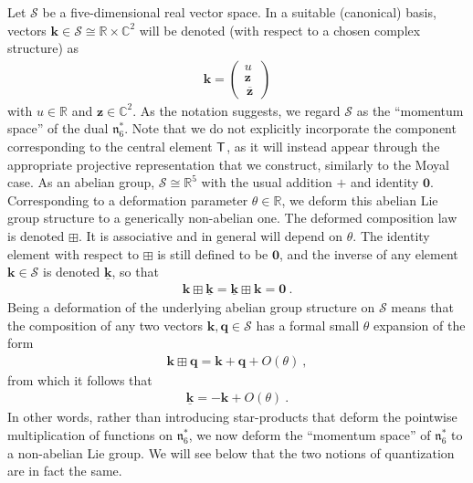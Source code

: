 \documentclass[11pt,a4paper]{article}
\newcommand{\comp}{\boxplus}                            %
\newcommand{\mbf}[1]{{\boldsymbol {#1} }}
\def\T{{\sf T}}
\def\mz{{\mbf z}}
\def\mk{{\mbf k}}
\def\mq{{\mbf q}}
\def\mfn{{\mathfrak n}}
\newcommand{\complex}{{\mathbb C}} %
\newcommand{\real}{{\mathbb R}} %
\newcommand{\beq}{\begin{eqnarray}}
\newcommand{\eeq}{\end{eqnarray}}
\begin{document}
Let $\mathcal{S}$ be a five-dimensional real vector space. In a
suitable (canonical) basis, vectors
$\mk\in\mathcal{S}\cong\real\times\complex^2$ will be denoted (with
respect to a chosen complex structure) as
\beq
\mk=\begin{pmatrix}u\\\mz\\\,\overline{\mz}\,\end{pmatrix}
\label{Svectors}\eeq
with $u\in\real$ and $\mz\in\complex^2$. As the notation suggests, we
regard $\mathcal{S}$ as the ``momentum space'' of the dual
$\mfn_6^*$. Note that we do not explicitly incorporate the component
corresponding to the central element $\T$, as it will instead appear
through the appropriate projective representation that we construct,
similarly to the Moyal case. As an abelian group,
$\mathcal{S}\cong\real^5$ with the usual addition $+$ and identity
$\mbf0$. Corresponding to a deformation parameter
$\theta\in\real$, we deform this abelian Lie group structure to a
generically non-abelian one. The deformed composition law is denoted
$\comp$. It is associative and in general will depend on
$\theta$. The identity element with respect to $\comp$ is still
defined to be $\mbf0$, and the inverse of any element $\mk\in\mathcal{S}$
is denoted $\underline{\mk}$, so that
\beq
\mk\comp\underline{\mk}=\underline{\mk}\comp\mk=\mbf0 \ .
\label{compinverse}\eeq
Being a deformation of the underlying abelian group structure on
$\mathcal{S}$ means that the composition of any two vectors
$\mk,\mq\in\mathcal{S}$ has a formal small $\theta$ expansion of the
form
\beq
\mk\comp\mq=\mk+\mq+O(\theta) \ ,
\label{compsmalltheta}\eeq
from which it follows that
\beq
\underline{\mk}=-\mk+O(\theta) \ .
\label{compinvsmalltheta}\eeq
In other words, rather than introducing star-products that deform the
pointwise multiplication of functions on $\mfn_6^*$, we now deform the
``momentum space'' of $\mfn_6^*$ to a non-abelian Lie group.
We will see below that the two notions of quantization are in fact the
same.
\end{document}
